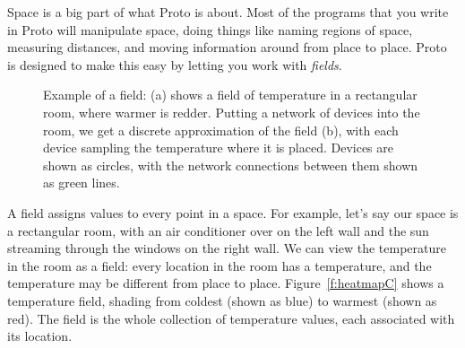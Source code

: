 \documentclass{article}
\begin{document}
Space is a big part of what Proto is about.  Most of the programs that
you write in Proto will manipulate space, doing things like naming
regions of space, measuring distances, and moving information around from
place to place.  Proto is designed to make this easy by letting you
work with {\em fields}.

\begin{figure}[ht]
\centering
{}
\caption{Example of a field: (a) shows a field of temperature in a
  rectangular room, where warmer is redder.  Putting a network of
  devices into the room, we get a discrete approximation of the field
  (b), with each device sampling the temperature where it is placed.
  Devices are shown as circles, with the network connections between
  them shown as green lines.}
\label{f:heatmap}
\end{figure}

A field assigns values to every point in a space.  For example, let's
say our space is a rectangular room, with an air conditioner over on
the left wall and the sun streaming through the windows on the right
wall.  We can view the temperature in the room as a field: every
location in the room has a temperature, and the temperature may be
different from place to place.  Figure~\ref{f:heatmapC} shows a
temperature field, shading from coldest (shown as blue) to warmest (shown
as red).  The field is the whole collection of temperature values, each
associated with its location.
\end{document}

